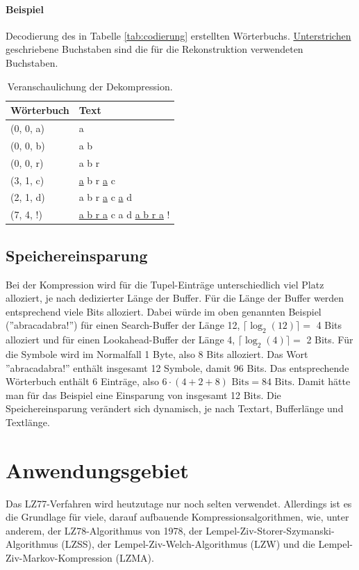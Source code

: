 \documentclass[10pt, a4paper]{article}
\begin{document}
\paragraph{Beispiel}
Decodierung des in Tabelle \ref{tab:codierung} erstellten Wörterbuchs. \underline{Unterstrichen} geschriebene Buchstaben sind die für die Rekonstruktion verwendeten Buchstaben.
\begin{table}[h]
    \centering
    \begin{tabular}{l|l}
        Wörterbuch & Text \\
        \hline
        (0, 0, a) & a \\
        \hline
        (0, 0, b) & a b \\
        \hline
        (0, 0, r) & a b r \\
        \hline
        (3, 1, c) & \underline{a} b r \underline{a} c \\
        \hline
        (2, 1, d) & a b r \underline{a} c \underline{a} d \\
        \hline
        (7, 4, !) & \underline{a b r a} c a d \underline{a b r a} ! \\
        \hline
    \end{tabular}
    \caption{Veranschaulichung der Dekompression.}
\end{table}

\subsection{Speichereinsparung}
Bei der Kompression wird für die Tupel-Einträge unterschiedlich viel Platz alloziert, je nach dedizierter Länge der Buffer. Für die Länge der Buffer werden entsprechend viele Bits alloziert. Dabei würde im oben genannten Beispiel (''abracadabra!'')  für einen Search-Buffer der Länge 12, $\lceil \log_2(12) \rceil =$ 4 Bits alloziert und für einen Lookahead-Buffer der Länge 4, $\lceil \log_2(4) \rceil =$ 2 Bits. Für die Symbole wird im Normalfall 1 Byte, also 8 Bits alloziert. Das Wort ''abracadabra!'' enthält insgesamt 12 Symbole, damit 96 Bits. Das entsprechende Wörterbuch enthält 6 Einträge, also $6 \cdot (4+2+8) \text{ Bits} = 84 \text{ Bits}$. Damit hätte man für das Beispiel eine Einsparung von insgesamt 12 Bits. Die Speichereinsparung verändert sich dynamisch, je nach Textart, Bufferlänge und Textlänge. \cite{website:FU-Berlin}


\section{Anwendungsgebiet}
Das LZ77-Verfahren wird heutzutage nur noch selten verwendet. Allerdings ist es die Grundlage für viele, darauf aufbauende Kompressionsalgorithmen, wie, unter anderem, der LZ78-Algorithmus von 1978, der Lempel-Ziv-Storer-Szymanski-Algorithmus (LZSS), der Lempel-Ziv-Welch-Algorithmus (LZW) und die Lempel-Ziv-Markov-Kompression (LZMA). \\
\end{document}
